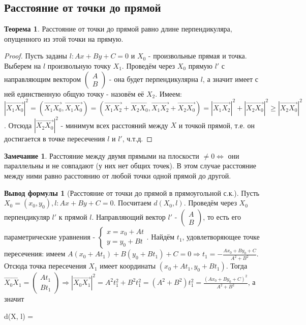 \documentclass[a4paper, 12pt]{article}
\theoremstyle{definition}
\newtheorem*{theorem}{Теорема}
\newtheorem*{formula}{Вывод формулы}
\newtheorem*{remark}{Замечание}
\newenvironment{boxedalign*}
  {\begin{equation*}\begin{lrbox}{\boxedalignbox}$\begin{aligned}}
  {\end{aligned}$\end{lrbox}\fbox{\usebox{\boxedalignbox}}\end{equation*}}
\begin{document}
	\subsection{Расстояние от точки до прямой}
	\begin{theorem}
		Расстояние от точки до прямой равно длине перпендикуляра, опущенного из этой точки на прямую.
	\end{theorem}
	\begin{proof}
		Пусть заданы $l: Ax + By + C = 0$ и $X_{0}$ - произвольные прямая и точка. Выберем на $l$ произвольную точку $X_{1}$. Проведём через $X_{0}$ прямую $l'$ с направляющим вектором $\begin{pmatrix} A \\ B \end{pmatrix}$  - она будет перпендикулярна $l$, а значит имеет с ней единственную общую точку - назовём её $X_{2}$. Имеем: $|\overrightarrow{X_{1}X_{0}}|^2 = (\overrightarrow{X_{1}X_{0}}, \overrightarrow{X_{1}X_{0}}) = (\overrightarrow{X_{1}X_{2}} + \overrightarrow{X_{2}X_{0}}, \overrightarrow{X_{1}X_{2}} + \overrightarrow{X_{2}X_{0}}) = |\overrightarrow{X_{1}X_{2}}|^2 + |\overrightarrow{X_{2}X_{0}}|^2 \geqslant |\overrightarrow{X_{2}X_{0}}|^2$. Отсюда $|\overrightarrow{X_{2}X_{0}}|^2$ - минимум всех расстояний между $X$ и точкой прямой, т.е. он достигается в точке пересечения $l$ и $l'$, ч.т.д.
	\end{proof}
	\begin{remark}
		Расстояние между двумя прямыми на плоскости $\neq 0 \Leftrightarrow$ они параллельны и не совпадают (у них нет общих точек). В этом случае расстояние между ними равно расстоянию от любой точки одной прямой до другой. 
	\end{remark}
	\begin{formula}[Расстояние от точки до прямой в прямоугольной с.к.]
		Пусть $X_{0} = (x_{0}, y_{0}), l: Ax + By + C = 0$. Посчитаем $d(X_{0}, l)$. Проведём через $X_{0}$ перпендикуляр $l'$ к прямой $l$. Направляющий вектор $l'$ - $\begin{pmatrix} A \\ B \end{pmatrix}$, то есть его параметрические уравнения - $\begin{cases} x = x_{0} + At \\ y = y_{0} + Bt \end{cases}$. Найдём $t_{1}$, удовлетворяющее точке пересечения: имеем $A(x_{0} + At_{1}) + B(y_{0} + Bt_{1}) + C = 0 \Rightarrow t_{1} = -\frac{Ax_{0} + By_{0} + C}{A^2+B^2}$.\\
		Отсюда точка пересечения $X_{1}$ имеет координаты $(x_{0} + At_{1}, y_{0} + Bt_{1})$. Тогда $\overrightarrow{X_{0}X_{1}} = \begin{pmatrix} At_{1} \\ Bt_{1} \end{pmatrix} \Rightarrow |\overrightarrow{X_{0}X_{1}}|^2 = A^2t_{1}^2 + B^2t_{1}^2 = (A^2 + B^2)t_{1}^2 = \frac{(Ax_{0} + By_{0} + C)^2}{A^2 + B^2}$, а значит 
		\begin{boxedalign*} d(X, l) =  \end{boxedalign*}
	\end{formula}
\end{document}
